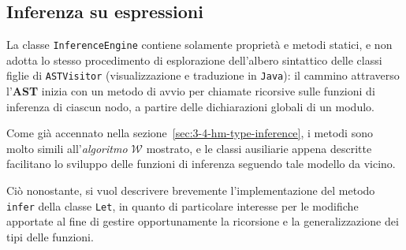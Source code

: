 \subsection{Inferenza su espressioni}
\label{sec:5-9-expression-inference}

La classe \texttt{InferenceEngine} contiene solamente proprietà e metodi statici, e non adotta lo stesso
procedimento di esplorazione dell'albero sintattico delle classi figlie di \texttt{ASTVisitor}
(visualizzazione e traduzione in \texttt{Java}): il cammino attraverso l'\textbf{AST} inizia con un metodo
di avvio per chiamate ricorsive sulle funzioni di inferenza di ciascun nodo,
a partire delle dichiarazioni globali di un modulo.


Come già accennato nella sezione~\ref{sec:3-4-hm-type-inference}, i metodi sono molto simili all'\textit{algoritmo $\mathcal{W}$} mostrato,
e le classi ausiliarie appena descritte facilitano lo sviluppo delle funzioni di inferenza seguendo tale modello da vicino.

\noindent Ciò nonostante, si vuol descrivere brevemente l'implementazione del metodo \texttt{infer} della classe \texttt{Let},
in quanto di particolare interesse per le modifiche apportate al fine di gestire opportunamente
la ricorsione e la generalizzazione dei tipi delle funzioni.

